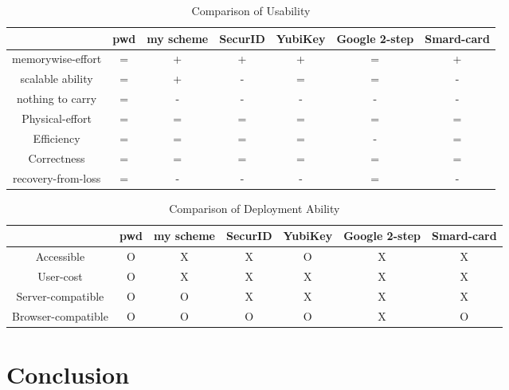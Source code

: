 \begin{CJK}{Bg5}{bsmi}
\begin{table}[h]
\begin{tabular}{|c|c|c|c|c|c|c|}
\hline
                   & pwd & my scheme & SecurID & YubiKey & Google 2-step & Smard-card \\ \hline
memorywise-effort  & =   & +         & +       & +       & =             & +          \\ \hline
scalable ability   & =   & +         & -       & =       & =             & -          \\ \hline
nothing to carry   & =   & -         & -       & -       & -             & -          \\ \hline
Physical-effort    & =   & =         & =       & =       & =             & =          \\ \hline
Efficiency         & =   & =         & =       & =       & -             & =          \\ \hline
Correctness        & =   & =         & =       & =       & =             & =          \\ \hline
recovery-from-loss & =   & -         & -       & -       & =             & -          \\ \hline
\end{tabular}
\caption{Comparison of Usability}
\end{table}

\begin{table}[h]
\begin{tabular}{|c|c|c|c|c|c|c|}
\hline
                   & pwd & my scheme & SecurID & YubiKey & Google 2-step & Smard-card \\ \hline
Accessible         & O   & X         & X       & O       & X             & X          \\ \hline
User-cost          & O   & X         & X       & X       & X             & X          \\ \hline
Server-compatible  & O   & O         & X       & X       & X             & X          \\ \hline
Browser-compatible & O   & O         & O       & O       & X             & O          \\ \hline
\end{tabular}
\caption{Comparison of Deployment Ability}
\end{table}

\chapter{Conclusion}


\end{CJK}
